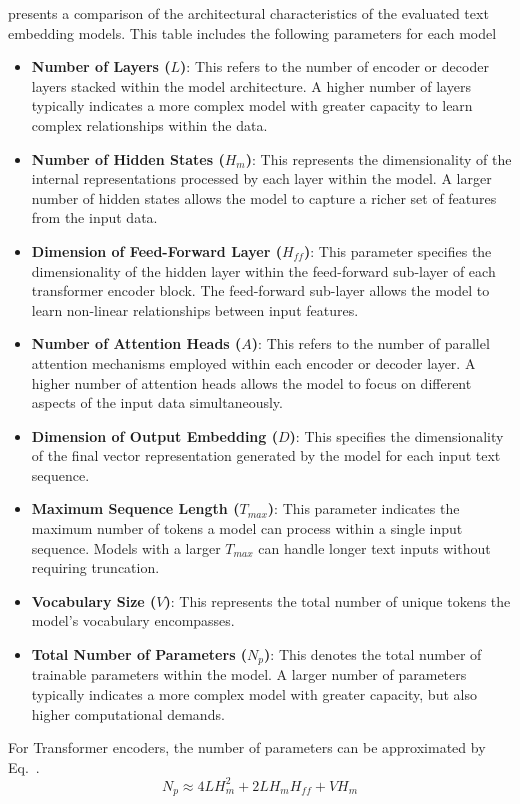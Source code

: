  presents a comparison of the architectural characteristics of the evaluated text embedding models.
This table includes the following parameters for each model

\begin{itemize}
    \item \textbf{Number of Layers ($L$)}:
        This refers to the number of encoder or decoder layers stacked within the model architecture.
        A higher number of layers typically indicates a more complex model with greater capacity to learn complex relationships within the data.
    \item \textbf{Number of Hidden States ($H_m$)}:
        This represents the dimensionality of the internal representations processed by each layer within the model.
        A larger number of hidden states allows the model to capture a richer set of features from the input data.
    \item \textbf{Dimension of Feed-Forward Layer ($H_{ff}$)}:
        This parameter specifies the dimensionality of the hidden layer within the feed-forward sub-layer of each transformer encoder block.
        The feed-forward sub-layer allows the model to learn non-linear relationships between input features.
    \item \textbf{Number of Attention Heads ($A$)}:
        This refers to the number of parallel attention mechanisms employed within each encoder or decoder layer.
        A higher number of attention heads allows the model to focus on different aspects of the input data simultaneously.
    \item \textbf{Dimension of Output Embedding ($D$)}:
        This specifies the dimensionality of the final vector representation generated by the model for each input text sequence.
    \item \textbf{Maximum Sequence Length ($T_{max}$)}:
        This parameter indicates the maximum number of tokens a model can process within a single input sequence.
        Models with a larger $T_{max}$ can handle longer text inputs without requiring truncation.
    \item \textbf{Vocabulary Size ($V$)}:
        This represents the total number of unique tokens the model's vocabulary encompasses.
    \item \textbf{Total Number of Parameters ($N_p$)}:
        This denotes the total number of trainable parameters within the model.
        A larger number of parameters typically indicates a more complex model with greater capacity, but also higher computational demands.
\end{itemize}


For Transformer encoders, the number of parameters can be approximated by Eq.~.
\begin{equation}
    \label{eq:model_params}
    N_p \approx 4LH_m^2 + 2LH_m H_{ff} + VH_m
\end{equation}


